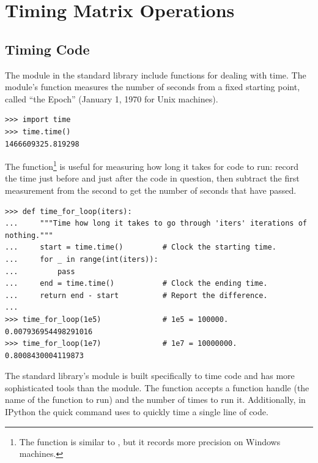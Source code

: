 \section*{Timing Matrix Operations} %


\subsection*{Timing Code} %

The  module in the standard library include functions for dealing with time.
The module's  function measures the number of seconds from a fixed starting point, called ``the Epoch'' (January 1, 1970 for Unix machines).

\begin{lstlisting}
>>> import time
>>> time.time()
1466609325.819298
\end{lstlisting}

The  function\footnote{The  function is similar to , but it records more precision on Windows machines.} is useful for measuring how long it takes for code to run: record the time just before and just after the code in question, then subtract the first measurement from the second to get the number of seconds that have passed.

\begin{lstlisting}
>>> def time_for_loop(iters):
...     """Time how long it takes to go through 'iters' iterations of nothing."""
...     start = time.time()         # Clock the starting time.
...     for _ in range(int(iters)):
...         pass
...     end = time.time()           # Clock the ending time.
...     return end - start          # Report the difference.
...
>>> time_for_loop(1e5)              # 1e5 = 100000.
0.007936954498291016
>>> time_for_loop(1e7)              # 1e7 = 10000000.
0.8008430004119873
\end{lstlisting}

The standard library's  module is built specifically to time code and has more sophisticated tools than the  module.
The  function accepts a function handle (the name of the function to run) and the number of times to run it.
Additionally, in IPython the quick command  uses  to quickly time a single line of code.

